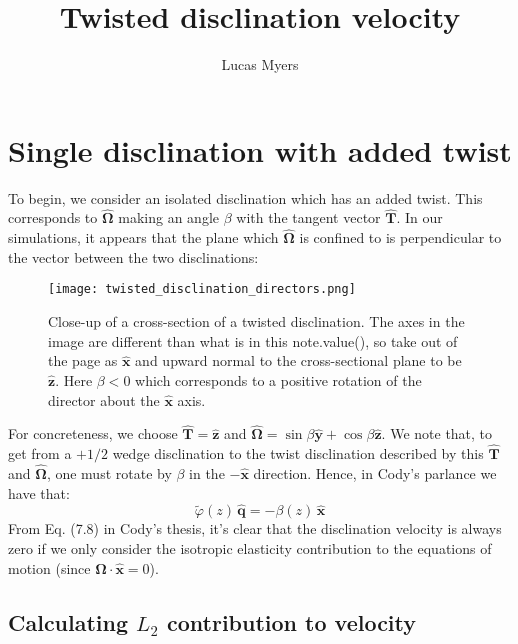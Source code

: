 \documentclass[reqno]{article}
\newcommand{\Omegahat}{\hat{\boldsymbol{\Omega}}}
\newcommand{\That}{\hat{\mathbf{T}}}
\newcommand{\xhat}{\hat{\mathbf{x}}}
\newcommand{\yhat}{\hat{\mathbf{y}}}
\newcommand{\zhat}{\hat{\mathbf{z}}}
\newcommand{\phitilde}{\tilde{\varphi}}
\begin{document}
\title{Twisted disclination velocity}
\author{Lucas Myers}
\maketitle

\section{Single disclination with added twist}

To begin, we consider an isolated disclination which has an added twist.
This corresponds to $\Omegahat$ making an angle $\beta$ with the tangent vector $\That$.
In our simulations, it appears that the plane which $\Omegahat$ is confined to is perpendicular to the vector between the two disclinations:
\begin{figure}[H]
    \centering
    \texttt{[image: twisted\_disclination\_directors.png]}
    \caption{Close-up of a cross-section of a twisted disclination. 
    The axes in the image are different than what is in this note.value(), so take out of the page as $\xhat$ and upward normal to the cross-sectional plane to be $\zhat$. 
    Here $\beta < 0$ which corresponds to a positive rotation of the director about the $\xhat$ axis.}
\end{figure}
For concreteness, we choose $\That = \zhat$ and $\Omegahat = \sin \beta \yhat + \cos \beta \zhat$.
We note that, to get from a $+1/2$ wedge disclination to the twist disclination described by this $\That$ and $\Omegahat$, one must rotate by $\beta$ in the $-\xhat$ direction.
Hence, in Cody's parlance we have that:
\begin{equation}
    \phitilde(z) \, \mathbf{\hat{q}}
    =
    -\beta(z) \, \xhat
\end{equation}
From Eq. (7.8) in Cody's thesis, it's clear that the disclination velocity is always zero if we only consider the isotropic elasticity contribution to the equations of motion (since $\Omegahat \cdot \xhat = 0$).

\subsection{Calculating $L_2$ contribution to velocity}
\end{document}
